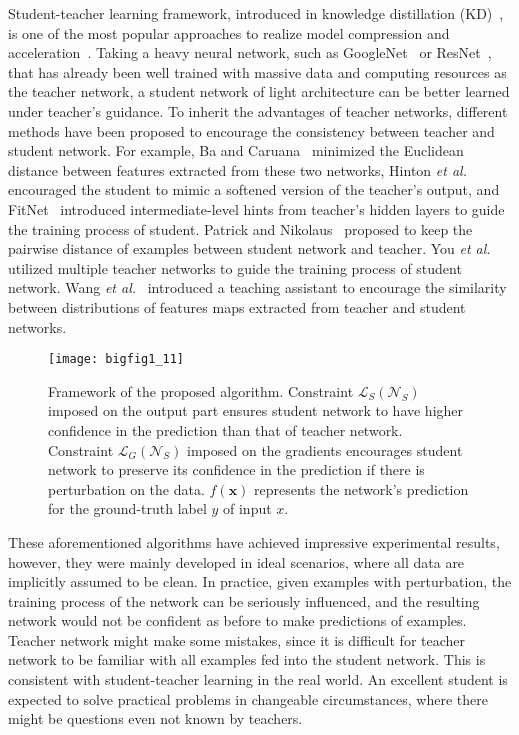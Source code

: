 \documentclass[journal]{IEEEtran}
\newcommand{\bx}{\bm{x}}
\begin{document}
Student-teacher learning framework, introduced in knowledge distillation (KD)~\cite{hinton2015distilling}, is one of the most popular approaches to realize model compression and acceleration~\cite{courbariaux2016binarized,wang2016cnnpack}. Taking a heavy neural network, such as GoogleNet~\cite{szegedy2016rethinking} or ResNet~\cite{he2016deep}, that has already been well trained with massive data and computing resources as the teacher network, a student network of light architecture can be better learned under teacher's guidance. To inherit the advantages of teacher networks, different methods have been proposed to encourage the consistency between teacher and student network. For example, Ba and Caruana~\cite{NIPS2014_5484} minimized the Euclidean distance between features extracted from these two networks, Hinton \emph{et al.}~\cite{hinton2015distilling} encouraged the student to mimic a softened version of the teacher's output, and FitNet~\cite{romero2014fitnets} introduced intermediate-level hints from teacher's hidden layers to guide the training process of student. Patrick and Nikolaus~\cite{mcclure2016representational} proposed to keep the pairwise distance of examples between student network and teacher. You \emph{et al.}~\cite{you2017learning} utilized multiple teacher networks to guide the training process of student network. Wang \emph{et al.}~\cite{wangAAAI18} introduced a teaching assistant to encourage the similarity between distributions of features maps extracted from teacher and student networks.
  
\begin{figure*}
\setlength{\abovecaptionskip}{0.3cm}
\setlength{\belowcaptionskip}{0.3cm}
\begin{minipage}[t]{1.0\linewidth}
\centering
\texttt{[image: bigfig1\_11]}
\caption{
Framework of the proposed algorithm. Constraint $\mathcal L_S(\mathcal N_S)$ imposed on the output part ensures student network to have higher confidence in the prediction than that of teacher network. Constraint $\mathcal L_G(\mathcal N_S)$ imposed on the gradients encourages student network to preserve its confidence in the prediction if there is perturbation on the data. $f(\bx)$ represents the network's prediction for the ground-truth label $y$ of input $x$.}
\label{fig1}
\end{minipage}
\end{figure*}

These aforementioned algorithms have achieved impressive experimental results, however, they were mainly developed in ideal scenarios, where all data are implicitly assumed to be clean. In practice, given examples with perturbation, the training process of the network can be seriously influenced, and the resulting network would not be confident as before to make predictions of examples. Teacher network might make some mistakes, since it is difficult for teacher network to be familiar with all examples fed into the student network. This is consistent with student-teacher learning in the real world. An excellent student is expected to solve practical problems in changeable circumstances, where there might be questions even not known by teachers. 
\end{document}
